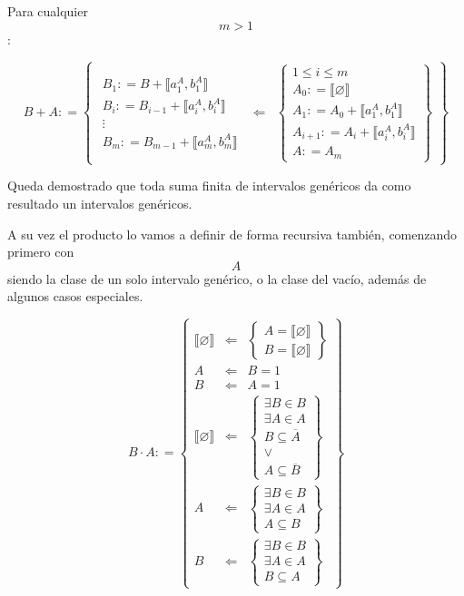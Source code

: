 \documentclass[
]{article}
\begin{document}
\begin{enumerate}
  Para cualquier \[m > 1\]:

  \[{{B + A}{: =}}\begin{Bmatrix}
  \begin{matrix}
  {B_{1}{: = {B + {⟦{a_{1}^{A},b_{1}^{A}}⟧}}}} \\
  {B_{i}{: = {B_{i - 1} + {⟦{a_{i}^{A},b_{i}^{A}}⟧}}}} \\
   \vdots \\
  {B_{m}{: = {B_{m - 1} + {⟦{a_{m}^{A},b_{m}^{A}}⟧}}}}
  \end{matrix} & {\Leftarrow} & \begin{Bmatrix}
  {{1 \leq i} \leq m} \\
  {A_{0}{: = {⟦\varnothing ⟧}}} \\
  {A_{1}{: = {A_{0} + {⟦{a_{1}^{A},b_{1}^{A}}⟧}}}} \\
  {A_{i + 1}{: = {A_{i} + {⟦{a_{i}^{A},b_{i}^{A}}⟧}}}} \\
  {A{: = A_{m}}}
  \end{Bmatrix}
  \end{Bmatrix}\]

  Queda demostrado que toda suma finita de intervalos genéricos da como
  resultado un intervalos gené\-ricos.

  A su vez el producto lo vamos a definir de forma recursiva también,
  comenzando primero con \[A\] siendo la clase de un solo intervalo
  genérico, o la clase del vacío, además de algu\-nos casos especiales.

  \[{B \cdot A}{: =}\begin{Bmatrix}
  {⟦\varnothing ⟧} & {\Leftarrow} & \begin{Bmatrix}
  {A = {⟦\varnothing ⟧}} \\
  {B = {⟦\varnothing ⟧}}
  \end{Bmatrix} \\
  A & {\Leftarrow} & {B = 1} \\
  B & {\Leftarrow} & {A = 1} \\
  {⟦\varnothing ⟧} & {\Leftarrow} & \begin{Bmatrix}
  {\exists{B \in B}} \\
  {\exists{A \in A}} \\
  {B \subseteq \overline{A}} \\
   \vee \\
  {A \subseteq \overline{B}}
  \end{Bmatrix} \\
  A & {\Leftarrow} & \begin{Bmatrix}
  {\exists{B \in B}} \\
  {\exists{A \in A}} \\
  {A \subseteq B}
  \end{Bmatrix} \\
  B & {\Leftarrow} & \begin{Bmatrix}
  {\exists{B \in B}} \\
  {\exists{A \in A}} \\
  {B \subseteq A}
  \end{Bmatrix}
  \end{Bmatrix}\]
\end{enumerate}
\end{document}
